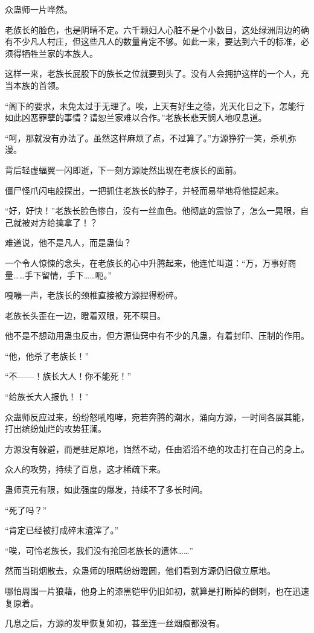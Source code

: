 \begin{this_body}
众蛊师一片哗然。

老族长的脸色，也是阴晴不定。六千颗妇人心脏不是个小数目，这处绿洲周边的确有不少凡人村庄，但这些凡人的数量肯定不够。如此一来，要达到六千的标准，必须得牺牲兰家的本族人。

这样一来，老族长屁股下的族长之位就要到头了。没有人会拥护这样的一个人，充当本族的首领。

“阁下的要求，未免太过于无理了。唉，上天有好生之德，光天化日之下，怎能行如此凶恶罪孽的事情？请恕兰家难以合作。”老族长悲天悯人地叹息道。

“呵，那就没有办法了。虽然这样麻烦了点，不过算了。”方源狰狞一笑，杀机弥漫。

背后轻虚蝠翼一闪即逝，下一刻方源陡然出现在老族长的面前。

僵尸怪爪闪电般探出，一把抓住老族长的脖子，并轻而易举地将他提起来。

“好，好快！”老族长脸色惨白，没有一丝血色。他彻底的震惊了，怎么一晃眼，自己就被对方给擒拿了！？

难道说，他不是凡人，而是蛊仙？

一个令人惊悚的念头，在老族长的心中升腾起来，他连忙叫道：“万，万事好商量……手下留情，手下……呃。”

嘎嘣一声，老族长的颈椎直接被方源捏得粉碎。

老族长头歪在一边，瞪着双眼，死不瞑目。

他不是不想动用蛊虫反击，但方源仙窍中有不少的凡蛊，有着封印、压制的作用。

“他，他杀了老族长！”

“不——！族长大人！你不能死！”

“给族长大人报仇！！”

众蛊师反应过来，纷纷怒吼咆哮，宛若奔腾的潮水，涌向方源，一时间各展其能，打出缤纷灿烂的攻势狂澜。

方源没有躲避，而是驻足原地，岿然不动，任由滔滔不绝的攻击打在自己的身上。

众人的攻势，持续了百息，这才稀疏下来。

蛊师真元有限，如此强度的爆发，持续不了多长时间。

“死了吗？”

“肯定已经被打成碎末渣滓了。”

“唉，可怜老族长，我们没有抢回老族长的遗体……”

然而当硝烟散去，众蛊师的眼睛纷纷瞪圆，他们看到方源仍旧傲立原地。

哪怕周围一片狼藉，他身上的漆黑铠甲仍旧如初，就算是打断掉的倒刺，也在迅速复原着。

几息之后，方源的发甲恢复如初，甚至连一丝烟痕都没有。


\end{this_body}
